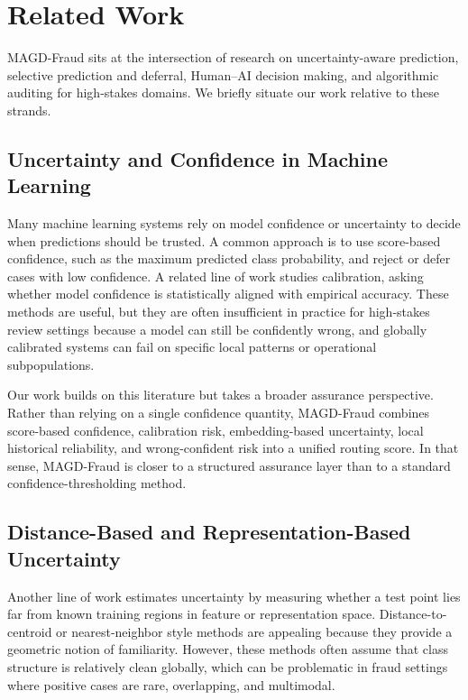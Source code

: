 \section{Related Work}
\label{sec:related_work}

MAGD-Fraud sits at the intersection of research on uncertainty-aware prediction, selective prediction and deferral, Human--AI decision making, and algorithmic auditing for high-stakes domains. We briefly situate our work relative to these strands.

\subsection{Uncertainty and Confidence in Machine Learning}
\label{subsec:rw_uncertainty}

Many machine learning systems rely on model confidence or uncertainty to decide when predictions should be trusted. A common approach is to use score-based confidence, such as the maximum predicted class probability, and reject or defer cases with low confidence. A related line of work studies calibration, asking whether model confidence is statistically aligned with empirical accuracy. These methods are useful, but they are often insufficient in practice for high-stakes review settings because a model can still be confidently wrong, and globally calibrated systems can fail on specific local patterns or operational subpopulations.

Our work builds on this literature but takes a broader assurance perspective. Rather than relying on a single confidence quantity, MAGD-Fraud combines score-based confidence, calibration risk, embedding-based uncertainty, local historical reliability, and wrong-confident risk into a unified routing score. In that sense, MAGD-Fraud is closer to a structured assurance layer than to a standard confidence-thresholding method.

\subsection{Distance-Based and Representation-Based Uncertainty}
\label{subsec:rw_distance}

Another line of work estimates uncertainty by measuring whether a test point lies far from known training regions in feature or representation space. Distance-to-centroid or nearest-neighbor style methods are appealing because they provide a geometric notion of familiarity. However, these methods often assume that class structure is relatively clean globally, which can be problematic in fraud settings where positive cases are rare, overlapping, and multimodal.

